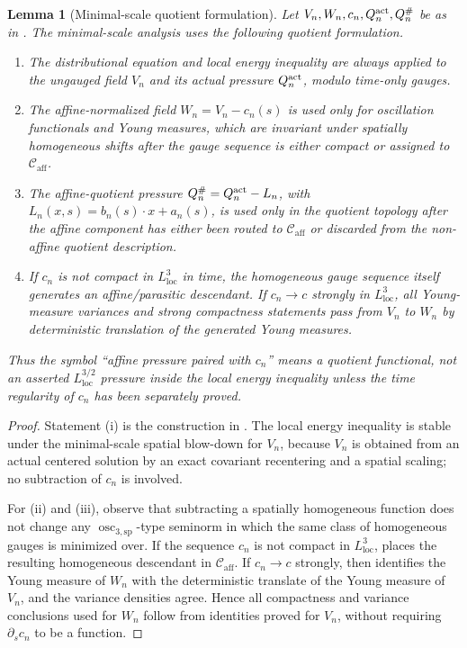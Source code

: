 \documentclass[11pt]{amsart}
\numberwithin{equation}{section}
\theoremstyle{plain}
\newtheorem{lemma}[lemma]{Lemma}
\theoremstyle{definition}
\theoremstyle{remark}
\newcommand{\loc}{\mathrm{loc}}
\newcommand{\Caff}{\mathcal C_{\mathrm{aff}}}
\newcommand{\oscsp}{\operatorname{osc}_{3,\mathrm{sp}}}
\begin{document}
\begin{lemma}[Minimal-scale quotient formulation]
\label{lem:first-bad-quotient-formulation}
Let \(V_n,W_n,c_n,Q_n^{\rm act},Q_n^\#\) be as in
.  The minimal-scale analysis uses the
following quotient formulation.
\begin{enumerate}[label=\textup{(\roman*)}]
   \item The distributional equation and local energy inequality are always
   applied to the ungauged field \(V_n\) and its actual pressure
   \(Q_n^{\rm act}\), modulo time-only gauges.
   \item The affine-normalized field \(W_n=V_n-c_n(s)\) is used only for
   oscillation functionals and Young measures, which are invariant under
   spatially homogeneous shifts after the gauge sequence is either compact or
   assigned to \(\Caff\).
   \item The affine-quotient pressure \(Q_n^\#=Q_n^{\rm act}-L_n\), with
   \(L_n(x,s)=b_n(s)\cdot x+a_n(s)\), is used only in the quotient topology
   after the affine component has either been routed to \(\Caff\) or discarded
   from the non-affine quotient description.
   \item If \(c_n\) is not compact in \(L^3_{\loc}\) in time, the homogeneous
   gauge sequence itself generates an affine/parasitic descendant.  If
   \(c_n\to c\) strongly in \(L^3_{\loc}\), all Young-measure variances and
   strong compactness statements pass from \(V_n\) to \(W_n\) by deterministic
   translation of the generated Young measures.
\end{enumerate}
Thus the symbol ``affine pressure paired with \(c_n\)'' means a quotient
functional, not an asserted \(L^{3/2}_{\loc}\) pressure inside the local energy
inequality unless the time regularity of \(c_n\) has been separately proved.
\end{lemma}

\begin{proof}
Statement (i) is the construction in
.  The local energy inequality is stable
under the minimal-scale spatial blow-down for \(V_n\), because \(V_n\) is obtained
from an actual centered solution by an exact covariant recentering and a spatial
scaling; no subtraction of \(c_n\) is involved.

For (ii) and (iii), observe that subtracting a spatially homogeneous function
does not change any \(\oscsp\)-type seminorm in which the same class of
homogeneous gauges is minimized over.  If the sequence \(c_n\) is not
compact in \(L^3_{\loc}\),  places the
resulting homogeneous descendant in \(\Caff\).  If \(c_n\to c\) strongly, then
 identifies the Young measure of \(W_n\)
with the deterministic translate of the Young measure of \(V_n\), and the
variance densities agree.  Hence all compactness and variance conclusions used
for \(W_n\) follow from identities proved for \(V_n\), without requiring
\(\partial_s c_n\) to be a function.
\end{proof}
\end{document}
